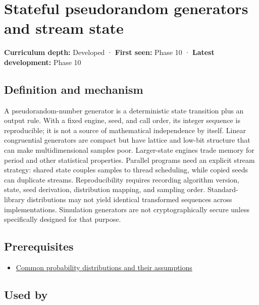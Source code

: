 \hypertarget{appendix-e0f7c7e08f3a}{}\label{referencestart:appendix-e0f7c7e08f3a}
\section{Stateful pseudorandom generators and stream state}\label{appendix-e0f7c7e08f3a-stateful-pseudorandom-generators-and-stream-state}

\textbf{Curriculum depth:} Developed · \textbf{First seen:} Phase 10 · \textbf{Latest development:} Phase 10

\subsection{Definition and mechanism}\label{appendix-e0f7c7e08f3a-definition-and-mechanism}

A pseudorandom-number generator is a deterministic state transition plus an output rule. With a fixed engine, seed, and call order, its integer sequence is reproducible; it is not a source of mathematical independence by itself. Linear congruential generators are compact but have lattice and low-bit structure that can make multidimensional samples poor. Larger-state engines trade memory for period and other statistical properties. Parallel programs need an explicit stream strategy: shared state couples samples to thread scheduling, while copied seeds can duplicate streams. Reproducibility requires recording algorithm version, state, seed derivation, distribution mapping, and sampling order. Standard-library distributions may not yield identical transformed sequences across implementations. Simulation generators are not cryptographically secure unless specifically designed for that purpose.

\subsection{Prerequisites}\label{appendix-e0f7c7e08f3a-prerequisites}

\begin{itemize}
\tightlist
\item
  \hyperref[appendix-a2360b435383]{Common probability distributions and their assumptions}
\end{itemize}

\subsection{Used by}\label{appendix-e0f7c7e08f3a-used-by}

